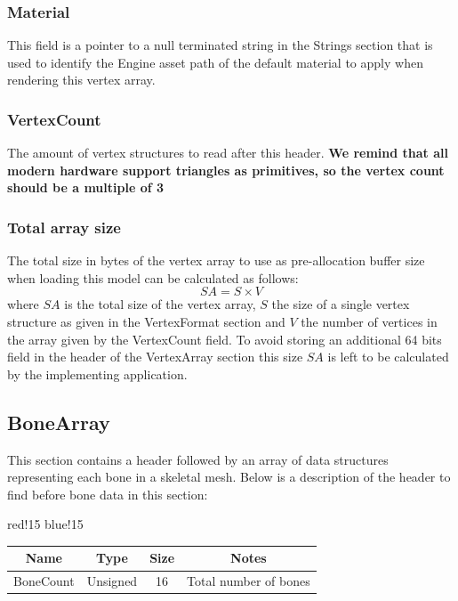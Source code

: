 \subsubsection{Material}
This field is a pointer to a null terminated string in the Strings section that is used to identify the Engine asset path of the default material to apply when rendering this vertex array.

\subsubsection{VertexCount}
The amount of vertex structures to read after this header.\newline
\textbf{We remind that all modern hardware support triangles as primitives, so the vertex count should be a multiple of 3}

\subsubsection{Total array size}
The total size in bytes of the vertex array to use as pre-allocation buffer size when loading this model can be calculated as follows:
\begin{equation}
    SA = S \times V
\end{equation}
where $SA$ is the total size of the vertex array, $S$ the size of a single vertex structure as given in the VertexFormat section and $V$ the number of vertices in the array given by the VertexCount field.\newline
To avoid storing an additional 64 bits field in the header of the VertexArray section this size $SA$ is left to be calculated by the implementing application.

\subsection{BoneArray}
This section contains a header followed by an array of data structures representing each bone in a skeletal mesh.\newline
Below is a description of the header to find before bone data in this section:
\begin{center}
    {
        {red!15}
        {blue!15}
        \begin{tabular}{|c|c|c|c|}
            \hline
            \textbf{Name} & \textbf{Type} & \textbf{Size} & \textbf{Notes} \\
    
            \hline\hline
            BoneCount & Unsigned & 16 & Total number of bones \\
            \hline
        \end{tabular}
    }
\end{center}

